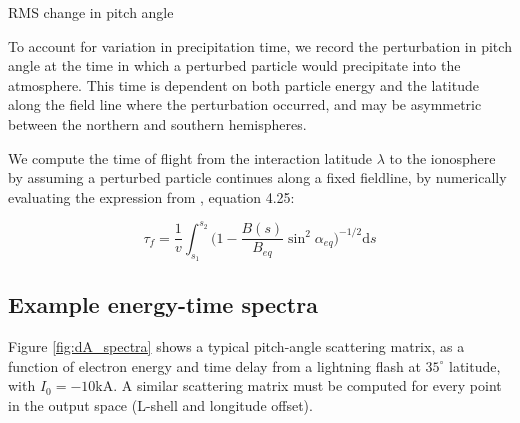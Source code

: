 \begin{algorithm}[t]
\caption{RMS change in pitch angle}\label{alg:RMS_change}
\begin{algorithmic}[1]
						 
						 
					\EndFor
				\EndFor
			\EndFor
		\EndFor
	\EndFor
\EndFor
\end{algorithmic}
\end{algorithm}


To account for variation in precipitation time, we record the perturbation in pitch angle at the time in which a perturbed particle would precipitate into the atmosphere. This time is dependent on both particle energy and the latitude along the field line where the perturbation occurred, and may be asymmetric between the northern and southern hemispheres.

We compute the time of flight from the interaction latitude $\lambda$ to the ionosphere by assuming a perturbed particle continues along a fixed fieldline, by numerically evaluating the expression from \cite{Walt1994}, equation 4.25:

\begin{equation}
\tau_f =  \frac{1}{v} \int_{s_1}^{s_2} \bigg(1 - \frac{B(s)}{B_{eq}}\sin^2\alpha_{eq}\bigg)^{-1/2} \mathrm{d}s
\label{eqn:bounce_time}
\end{equation}

\subsection{Example energy-time spectra}
Figure \ref{fig:dA_spectra} shows a typical pitch-angle scattering matrix, as a function of electron energy and time delay from a lightning flash at $35^\circ$ latitude, with $I_0=-10$kA. A similar scattering matrix must be computed for every point in the output space (L-shell and longitude offset).

